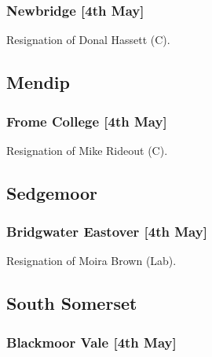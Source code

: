 \documentclass[a4paper,openany]{book}
\begin{document}
\begin{resultsiii}
\subsubsection*{Newbridge \hspace*{\fill}\nolinebreak[1]%
\enspace\hspace*{\fill}
[4th May]}


Resignation of Donal Hassett (C).

\subsection*{Mendip}

\subsubsection*{Frome College \hspace*{\fill}\nolinebreak[1]%
\enspace\hspace*{\fill}
[4th May]}


Resignation of Mike Rideout (C).

\subsection*{Sedgemoor}

\subsubsection*{Bridgwater Eastover \hspace*{\fill}\nolinebreak[1]%
\enspace\hspace*{\fill}
[4th May]}


Resignation of Moira Brown (Lab).

\subsection*{South Somerset}

\subsubsection*{Blackmoor Vale \hspace*{\fill}\nolinebreak[1]%
\enspace\hspace*{\fill}
[4th May]}


\end{resultsiii}
\end{document}
